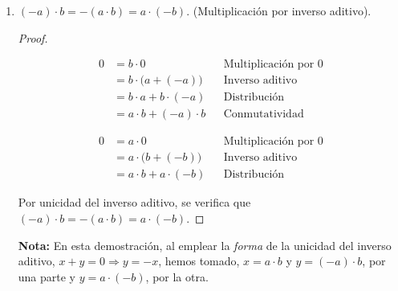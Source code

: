\documentclass[11pt]{article}
\begin{document}
\begin{enumerate}[label=\alph*)]
 \item $(-a) \cdot b = -(a \cdot b) = a \cdot (-b)$. (Multiplicación por inverso aditivo).%
 \begin{proof} \leavevmode
 \begin{center}\vspace{-2em}
 \begin{minipage}[t]{.5\linewidth}
  \begin{align*}
   0 &= b\cdot 0 && \text{Multiplicación por $0$}\\
   &= b \cdot \bigl(a+(-a)\bigr) && \text{Inverso aditivo}\\
   &= b\cdot a + b\cdot (-a) && \text{Distribución}\\
   &= a\cdot b + (-a) \cdot b && \text{Conmutatividad}
  \end{align*}
 \end{minipage}%
 \begin{minipage}[t]{.5\linewidth}
  \begin{align*}
   0 &= a\cdot 0 && \text{Multiplicación por $0$}\\
   &= a \cdot \bigl(b+(-b)\bigr) && \text{Inverso aditivo}\\
   &= a\cdot b + a\cdot (-b) && \text{Distribución}
  \end{align*}
 \end{minipage}
 \end{center} Por unicidad del inverso aditivo, se verifica que $(-a)\cdot b = -(a\cdot b)=a\cdot (-b)$.
 \end{proof}%
 \textbf{Nota:} En esta demostración, al emplear la \textit{forma} de la unicidad del inverso aditivo, $x+y=0 \Longrightarrow y=-x$, hemos tomado, $x=a\cdot b$ y $y=(-a)\cdot b$, por una parte y $y=a\cdot (-b)$, por la otra.


\end{enumerate}
\end{document}
